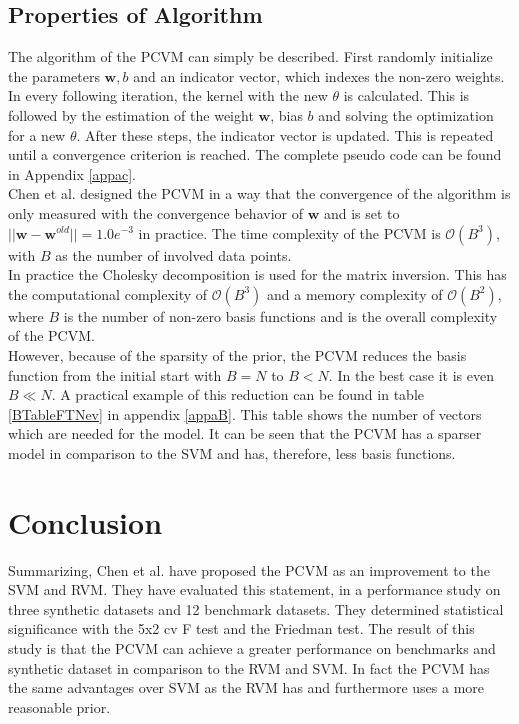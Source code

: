 \subsection{Properties of Algorithm}\label{PcSubSecAlgo}
The algorithm of the \acs{PCVM} can simply be described.
First randomly initialize the parameters $\mathbf{w},b$ and an indicator vector, which indexes the non-zero weights.
In every following iteration, the kernel with the new $\theta$ is calculated.
This is followed by the estimation of the weight $\mathbf{w}$, bias $b$ and solving the optimization for a new $\theta$. After these steps, the indicator vector is updated.
This is repeated until a convergence criterion is reached.\cite{Chen.2009}
The complete pseudo code can be found in Appendix \ref{appac}.\\
Chen et al. designed the \acs{PCVM} in a way that the convergence of the algorithm is only measured with the convergence behavior of $\mathbf{w}$ and is set to $||{\mathbf{w}-\mathbf{w}^{old}}|| = 1.0e^{-3}$ in practice. 
The time complexity of the \acs{PCVM} is $\mathcal{O}(B^3)$, with $B$ as the number of involved data points.\\
In practice the Cholesky decomposition is used for the matrix inversion. 
This has the computational complexity of $\mathcal{O}(B^3)$ and a memory complexity of $\mathcal{O}(B^2)$, where $B$ is the number of non-zero basis functions and is the overall complexity of the \acs{PCVM}.\cite{Chen.2009}\\
However, because of the sparsity of the prior, the \acs{PCVM} reduces the basis function from the initial start with $B = N$ to $B < N$.
In the best case it is even $B \ll N$.
A practical example of this reduction can be found in table \ref{BTableFTNev} in appendix \ref{appaB}. 
This table shows the number of vectors which are needed for the model. 
It can be seen that the \acs{PCVM} has a sparser model in comparison to the \acs{SVM} and has, therefore, less basis functions.

\section{Conclusion}
Summarizing, Chen et al. have proposed the \acs{PCVM} as an improvement to the \acs{SVM} and \acs{RVM}.
They have evaluated this statement, in a performance study on three synthetic datasets and 12 benchmark datasets.
They determined statistical significance with the 5x2 cv F test and the Friedman test.
The result of this study is that the \acs{PCVM} can achieve a greater performance on benchmarks and synthetic dataset in comparison to the \acs{RVM} and \acs{SVM}.
In fact the \acs{PCVM} has the same advantages over \ac{SVM} as the \acs{RVM} has and furthermore uses a more reasonable prior.\cite{Chen.2009}
